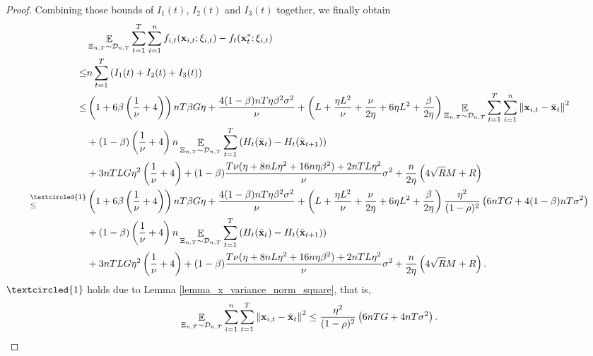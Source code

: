 \documentclass{article}
\begin{document}
\begin{proof}
Combining those bounds of $I_1(t)$, $I_2(t)$ and $I_3(t)$ together, we finally obtain
\begin{align}
\nonumber
& \EE_{ \Xi_{n,T} \sim \Dcal_{n,T} } \sum_{t=1}^T\sum_{i=1}^n f_{i,t}(\x_{i,t};\xi_{i,t}) - f_t(\x_t^\ast;\xi_{i,t}) \\ \nonumber
\le & n \sum_{t=1}^T \lrincir{ I_1(t) + I_2(t) + I_3(t) } \\ \nonumber
\le & \lrincir{1 + 6\beta\lrincir{\frac{1}{\nu}+4}}nT\beta G \eta + \frac{4(1-\beta)nT\eta \beta^2 \sigma^2}{\nu} + \lrincir{ L + \frac{\eta L^2}{\nu} + \frac{\nu}{2\eta} + 6\eta L^2  + \frac{\beta}{2\eta} }\EE_{ \Xi_{n,T} \sim \Dcal_{n,T} }\sum_{t=1}^T\sum_{i=1}^n\lrnorm{\x_{i,t} - \bar{\x}_t }^2 \\ \nonumber 
&+ (1-\beta)\lrincir{\frac{1}{\nu} + 4}n \EE_{ \Xi_{n,T} \sim \Dcal_{n,T} }\sum_{t=1}^T \lrincir{H_t(\bar{\x}_t) - H_t(\bar{\x}_{t+1})}  \\ \nonumber 
& + 3nTLG\eta^2\lrincir{ \frac{1}{\nu} + 4 } + (1-\beta)\frac{T\nu(\eta + 8nL\eta^2 + 16n\eta\beta^2) + 2nTL\eta^2}{\nu} \sigma^2  + \frac{n}{2\eta}\lrincir{ 4\sqrt{R}M + R  } \\ \nonumber
\refabovecir{\le}{\textcircled{1}} & \lrincir{1 + 6\beta\lrincir{\frac{1}{\nu}+4}}nT\beta G \eta + \frac{4(1-\beta)nT\eta \beta^2 \sigma^2}{\nu} + \lrincir{ L + \frac{\eta L^2}{\nu} + \frac{\nu}{2\eta} + 6\eta L^2  + \frac{\beta}{2\eta} }\frac{\eta^2}{(1-\rho)^2}   \lrincir{ 6nTG + 4(1-\beta)nT\sigma^2 } \\ \nonumber 
&+ (1-\beta) \lrincir{\frac{1}{\nu} + 4}n\EE_{ \Xi_{n,T} \sim \Dcal_{n,T} }\sum_{t=1}^T \lrincir{H_t(\bar{\x}_t) - H_t(\bar{\x}_{t+1})} \\ \nonumber 
& + 3nTLG\eta^2\lrincir{ \frac{1}{\nu} + 4 } + (1-\beta)\frac{T\nu(\eta + 8nL\eta^2 + 16n\eta\beta^2) + 2nTL\eta^2}{\nu} \sigma^2  + \frac{n}{2\eta}\lrincir{ 4\sqrt{R}M + R  }.
\end{align}  $\textcircled{1}$ holds due to Lemma \ref{lemma_x_variance_norm_square}, that is, 
\begin{align}
\nonumber
\mathop{\mathbb{E}}_{ \Xi_{n,T}\sim \mathcal{D}_{n,T} } \sum_{i=1}^n\sum_{t=1}^T \left\lVert{\bf x}_{i,t} - \bar{{\bf x}}_t\right\rVert^2 \le \frac{\eta^2}{(1-\rho)^2}   \left(  6nTG + 4nT \sigma^2  \right).
\end{align}



\end{proof}
\end{document}
